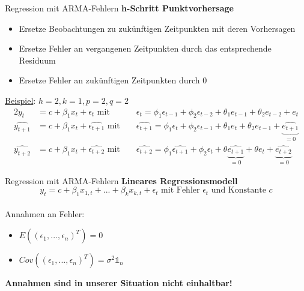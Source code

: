 \begin{frame}{Regression mit ARMA-Fehlern}
	\textbf{h-Schritt Punktvorhersage}\\
	\begin{itemize}
		\item Ersetze Beobachtungen zu zukünftigen Zeitpunkten mit deren Vorhersagen
		\item Ersetze Fehler an vergangenen Zeitpunkten durch das entsprechende Residuum
		\item Ersetze Fehler an zukünftigen Zeitpunkten durch 0
	\end{itemize}
	\underline{Beispiel}: $h=2, k=1, p=2, q=2$
	\begin{alignat*}{2}
		y_t &= c + \beta_1 x_{t} + \epsilon_t \text{ mit }&&\epsilon_{t} = \phi_1\epsilon_{t-1} + \phi_2\epsilon_{t-2} + \theta_1e_{t-1} + \theta_2e_{t-2} + e_t \\		
		\widehat{y_{t+1}} &= c + \beta_1 x_{t} + \widehat{\epsilon_{t+1}} \text{ mit }&& \widehat{\epsilon_{t+1}} = \phi_1\epsilon_{t} + \phi_2\epsilon_{t-1} + \theta_1e_{t} + \theta_2e_{t-1} + \underbrace{\widehat{e_{t+1}}}_{=0}\\
		\widehat{y_{t+2}} &= c + \beta_1 x_{t} + \widehat{\epsilon_{t+2}}\text{ mit }&&\widehat{\epsilon_{t+2}} = \phi_1\widehat{\epsilon_{t+1}} + \phi_2\epsilon_t + \theta \underbrace{\widehat{e_{t+1}}}_{=0} + \theta e_t + \underbrace{\widehat{e_{t+2}}}_{=0}
	\end{alignat*}
\end{frame}
\begin{frame}{Regression mit ARMA-Fehlern}
	\textbf{Lineares Regressionsmodell} \\
	$$y_{t} = c + \beta_1 x_{1,t} + ... + \beta_k x_{k,t} + \epsilon_t \text{ mit Fehler } \epsilon_t \text{ und Konstante }c$$ \\
	Annahmen an Fehler:
	\begin{itemize}
		\item $E((\epsilon_1,...,\epsilon_n)^T) = 0$
		\item $Cov((\epsilon_1,...,\epsilon_n)^T)=\sigma^2 \mathds{1}_n$
	\end{itemize}
	\textbf{Annahmen sind in unserer Situation nicht einhaltbar!}
\end{frame}

